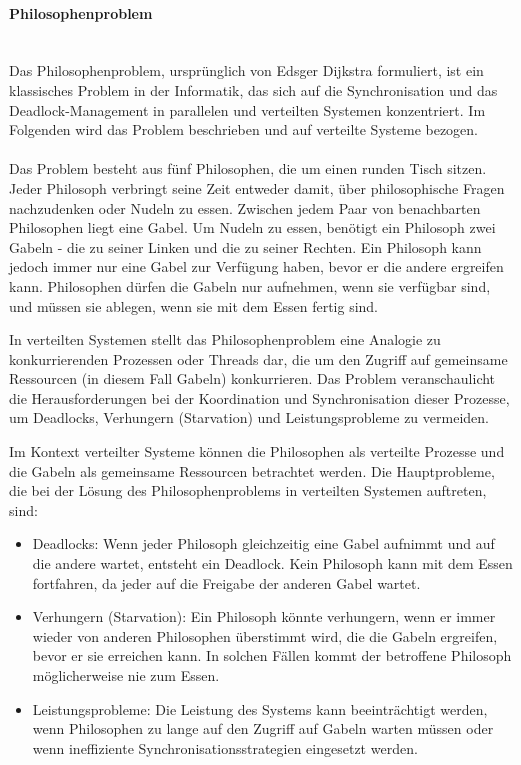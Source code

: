 \paragraph{Philosophenproblem\\\\}
Das Philosophenproblem, ursprünglich von Edsger Dijkstra formuliert, ist ein klassisches Problem in der Informatik, das sich auf die Synchronisation und das Deadlock-Management in parallelen und verteilten Systemen konzentriert. Im Folgenden wird das Problem beschrieben und auf verteilte Systeme bezogen.
\\\\
Das Problem besteht aus fünf Philosophen, die um einen runden Tisch sitzen. Jeder Philosoph verbringt seine Zeit entweder damit, über philosophische Fragen nachzudenken oder Nudeln zu essen. Zwischen jedem Paar von benachbarten Philosophen liegt eine Gabel. Um Nudeln zu essen, benötigt ein Philosoph zwei Gabeln - die zu seiner Linken und die zu seiner Rechten. Ein Philosoph kann jedoch immer nur eine Gabel zur Verfügung haben, bevor er die andere ergreifen kann. Philosophen dürfen die Gabeln nur aufnehmen, wenn sie verfügbar sind, und müssen sie ablegen, wenn sie mit dem Essen fertig sind.

In verteilten Systemen stellt das Philosophenproblem eine Analogie zu konkurrierenden Prozessen oder Threads dar, die um den Zugriff auf gemeinsame Ressourcen (in diesem Fall Gabeln) konkurrieren. Das Problem veranschaulicht die Herausforderungen bei der Koordination und Synchronisation dieser Prozesse, um Deadlocks, Verhungern (Starvation) und Leistungsprobleme zu vermeiden.

Im Kontext verteilter Systeme können die Philosophen als verteilte Prozesse und die Gabeln als gemeinsame Ressourcen betrachtet werden. Die Hauptprobleme, die bei der Lösung des Philosophenproblems in verteilten Systemen auftreten, sind:
\begin{itemize}
\item Deadlocks: Wenn jeder Philosoph gleichzeitig eine Gabel aufnimmt und auf die andere wartet, entsteht ein Deadlock. Kein Philosoph kann mit dem Essen fortfahren, da jeder auf die Freigabe der anderen Gabel wartet.
\item Verhungern (Starvation): Ein Philosoph könnte verhungern, wenn er immer wieder von anderen Philosophen überstimmt wird, die die Gabeln ergreifen, bevor er sie erreichen kann. In solchen Fällen kommt der betroffene Philosoph möglicherweise nie zum Essen.
\item Leistungsprobleme: Die Leistung des Systems kann beeinträchtigt werden, wenn Philosophen zu lange auf den Zugriff auf Gabeln warten müssen oder wenn ineffiziente Synchronisationsstrategien eingesetzt werden.
\end{itemize}

